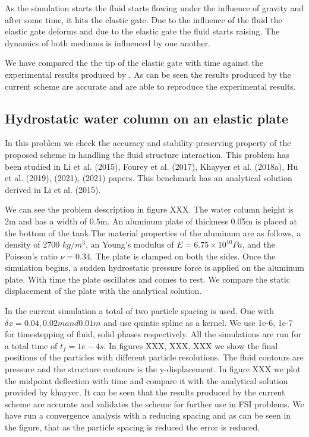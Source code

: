 \documentclass[preprint,12pt]{elsarticle}
\begin{document}
As the simulation starts the fluid starts flowing under the influence of
gravity and after some time, it hits the elastic gate. Due to the influence of
the fluid the elastic gate deforms and due to the elastic gate the fluid
starts raising. The dynamics of both mediums is influenced by one another.


We have compared the the tip of the elastic gate with time against the
experimental results produced by \cite{xxx}. As can be seen the results
produced by the current scheme are accurate and are able to reproduce the
experimental results.



\subsection{Hydrostatic water column on an elastic plate}
\label{sec:hydrostatic-water-column-on-an-elastic-plate}

In this problem we check the accuracy and stability-preserving property of the
proposed scheme in handling the fluid structure interaction. This problem has
been studied in Li et al. (2015), Fourey et al. (2017), Khayyer et
al. (2018a), Hu et al. (2019), (2021), (2021) papers. This benchmark has an
analytical solution derived in Li et al. (2015).

We can see the problem description in figure XXX. The water column height is
2m and has a width of 0.5m. An aluminum plate of thickness 0.05m is placed at
the bottom of the tank.The material properties of the aluminum are as follows,
a density of 2700 $kg/m^3$, an Young’s modulus of $E = 6.75 \times 10^{10} Pa$,
and the Poisson’s ratio $\nu = 0.34$. The plate is clamped on both the
sides. Once the simulation begins, a sudden hydrostatic pressure force is
applied on the aluminum plate. With time the plate oscillates and comes to
rest. We compare the static displacement of the plate with the analytical
solution.

In the current simulation a total of two particle spacing is used. One with
$\delta x = 0.04 , 0.02m and 0.01 m$ and use quintic spline as a kernel. We
use 1e-6, 1e-7 for timestepping of fluid, solid phases respectively. All the
simulations are run for a total time of $t_f = 1e-4s$. In figures XXX, XXX,
XXX we show the final positions of the particles with different particle
resolutions. The fluid contours are pressure and the structure contours is the
y-displacement. In figure XXX we plot the midpoint deflection with time and
compare it with the analytical solution provided by khayyer. It can be seen
that the results produced by the current scheme are accurate and validates the
scheme for further use in FSI problems. We have run a convergence analysis
with a reducing spacing and as can be seen in the figure, that as the particle
spacing is reduced the error is reduced.
\end{document}
